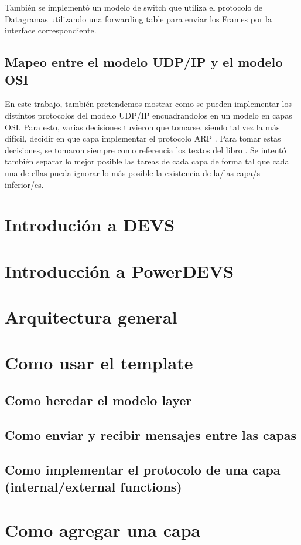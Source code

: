 \documentclass[10pt,a4paper]{article}
\begin{document}
También se implementó un modelo de switch que utiliza el protocolo de Datagramas \cite{petersonSwitchDatagram} utilizando una forwarding table para enviar los Frames por la interface correspondiente. 

\subsection{Mapeo entre el modelo UDP/IP y el modelo OSI}

En este trabajo, también pretendemos mostrar como se pueden implementar los distintos protocolos del modelo UDP/IP encuadrandolos en un modelo en capas OSI. Para esto, varias decisiones tuvieron que tomarse, siendo tal vez la más difícil, decidir en que capa implementar el protocolo ARP \cite[p.~228]{peterson2007computer}. Para tomar estas decisiones, se tomaron siempre como referencia los textos del libro \cite{peterson2007computer}. Se intentó también separar lo mejor posible las tareas de cada capa de forma tal que cada una de ellas pueda ignorar lo más posible la existencia de la/las capa/s inferior/es.

\section{Introdución a DEVS}
\section{Introducción a PowerDEVS}
\section{Arquitectura general}
\section{Como usar el template}
\subsection{Como heredar el modelo layer}
\subsection{Como enviar y recibir mensajes entre las capas}
\subsection{Como implementar el protocolo de una capa (internal/external functions)}
\section{Como agregar una capa}
\end{document}
